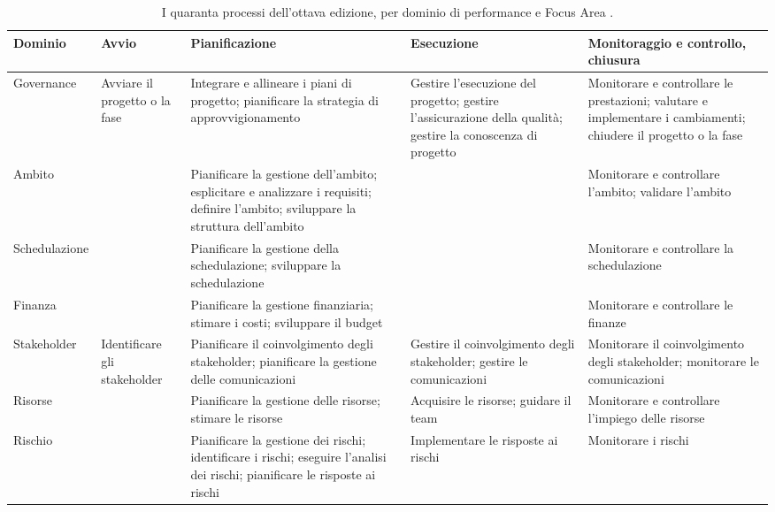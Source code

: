 \begin{table}[htbp]
\centering
\scriptsize
\linespread{1}\selectfont
\renewcommand{\arraystretch}{1.15}
\caption{I quaranta processi dell'ottava edizione, per dominio di performance e Focus Area \cite{pmbok8}.}
\label{tab:pmbok-processi}
\begin{tabularx}{\textwidth}{@{}>{\raggedright\arraybackslash}p{2.05cm}>{\raggedright\arraybackslash}X>{\raggedright\arraybackslash}X>{\raggedright\arraybackslash}X>{\raggedright\arraybackslash}X@{}}
\toprule
\textbf{Dominio} & \textbf{Avvio} & \textbf{Pianificazione} & \textbf{Esecuzione} & \textbf{Monitoraggio e controllo, chiusura} \\
\midrule
Governance & Avviare il progetto o la fase & Integrare e allineare i piani di progetto; pianificare la strategia di approvvigionamento & Gestire l'esecuzione del progetto; gestire l'assicurazione della qualit\`a; gestire la conoscenza di progetto & Monitorare e controllare le prestazioni; valutare e implementare i cambiamenti; chiudere il progetto o la fase \\
Ambito &  & Pianificare la gestione dell'ambito; esplicitare e analizzare i requisiti; definire l'ambito; sviluppare la struttura dell'ambito &  & Monitorare e controllare l'ambito; validare l'ambito \\
Schedulazione &  & Pianificare la gestione della schedulazione; sviluppare la schedulazione &  & Monitorare e controllare la schedulazione \\
Finanza &  & Pianificare la gestione finanziaria; stimare i costi; sviluppare il budget &  & Monitorare e controllare le finanze \\
Stakeholder & Identificare gli stakeholder & Pianificare il coinvolgimento degli stakeholder; pianificare la gestione delle comunicazioni & Gestire il coinvolgimento degli stakeholder; gestire le comunicazioni & Monitorare il coinvolgimento degli stakeholder; monitorare le comunicazioni \\
Risorse &  & Pianificare la gestione delle risorse; stimare le risorse & Acquisire le risorse; guidare il team & Monitorare e controllare l'impiego delle risorse \\
Rischio &  & Pianificare la gestione dei rischi; identificare i rischi; eseguire l'analisi dei rischi; pianificare le risposte ai rischi & Implementare le risposte ai rischi & Monitorare i rischi \\
\bottomrule
\end{tabularx}
\end{table}
\newpage

